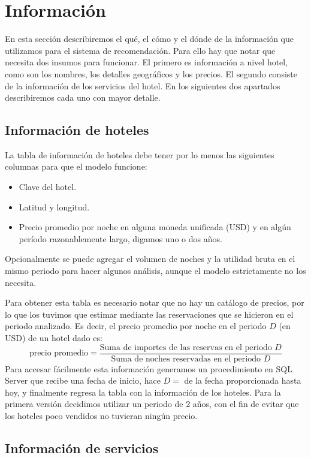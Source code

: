\documentclass[12pt]{report}
\begin{document}
\section{Información}

En esta sección describiremos el qué, el cómo y el dónde de la información que utilizamos para el sistema de recomendación. Para ello hay que notar que necesita dos insumos para funcionar. El primero es información a nivel hotel, como son los nombres, los detalles geográficos y los precios. El segundo consiste de la información de los servicios del hotel. En los siguientes dos apartados describiremos cada uno con mayor detalle.

\subsection*{Información de hoteles}

La tabla de información de hoteles debe tener por lo menos las siguientes columnas para que el modelo funcione:
\begin{itemize}
	\item Clave del hotel.
	\item Latitud y longitud.
	\item Precio promedio por noche en alguna moneda unificada (USD) y en algún período razonablemente largo, digamos uno o dos años.
\end{itemize}
Opcionalmente se puede agregar el volumen de noches y la utilidad bruta en el mismo periodo para hacer algunos análisis, aunque el modelo estrictamente no los necesita.

Para obtener esta tabla es necesario notar que no hay un catálogo de precios, por lo que los tuvimos que estimar mediante las reservaciones que se hicieron en el periodo analizado. Es decir, el precio promedio por noche en el periodo $D$ (en USD) de un hotel dado es:
\[
\text{precio promedio} = \frac{\text{Suma de importes de las reservas en el periodo } D}{\text{Suma de noches reservadas en el periodo } D}
\]
Para accesar fácilmente esta información generamos un procedimiento en SQL Server que recibe una fecha de inicio, hace $D = $ de la fecha proporcionada hasta hoy, y finalmente regresa la tabla con la información de los hoteles. Para la primera versión decidimos utilizar un periodo de 2 años, con el fin de evitar que los hoteles poco vendidos no tuvieran ningún precio.

\subsection*{Información de servicios}
\end{document}
